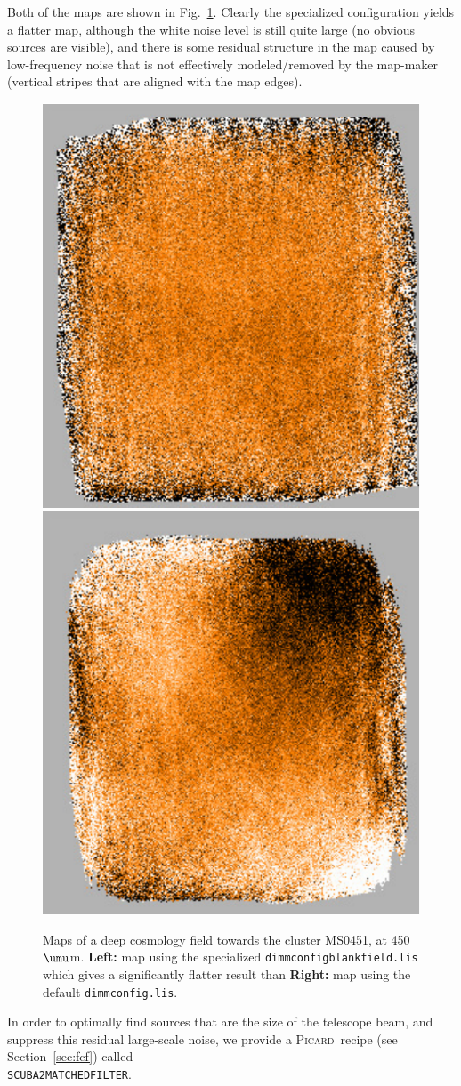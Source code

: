 \documentclass[twoside,11pt]{article}
\newcommand{\micron}{\mbox{\,${\umu}$m}}            %
\newcommand{\xref}[3]{#1}
\renewcommand{\_}{\texttt{\symbol{95}}}
\newcommand{\picard}{\xref{\textsc{Picard}}{sun231}{}}
\newcommand{\drrecipe}[1]{\texttt{#1}}
\begin{document}
Both of the maps are shown in Fig.~\ref{fig:cosmomap}. Clearly the
specialized configuration yields a flatter map, although the white
noise level is still quite large (no obvious sources are visible), and
there is some residual structure in the map caused by low-frequency
noise that is not effectively modeled/removed by the map-maker
(vertical stripes that are aligned with the map edges).

\begin{figure}
\begin{center}
\includegraphics[width=0.49\linewidth]{sc19_cosmo_map}
\includegraphics[width=0.49\linewidth]{sc19_cosmo_map_default} \\
\caption{Maps of a deep cosmology field towards the cluster MS0451, at
  450\micron. {\bf Left:} map using the specialized
  \texttt{dimmconfig\_blank\_field.lis} which gives a significantly
  flatter result than {\bf Right:} map using the default
  \texttt{dimmconfig.lis}.}
\label{fig:cosmomap}
\end{center}
\end{figure}

In order to optimally find sources that are the size of the telescope
beam, and suppress this residual large-scale noise, we provide a
\picard\ recipe (see Section~\ref{sec:fcf}) called
\\ \drrecipe{SCUBA2\_MATCHED\_FILTER}.
\end{document}
